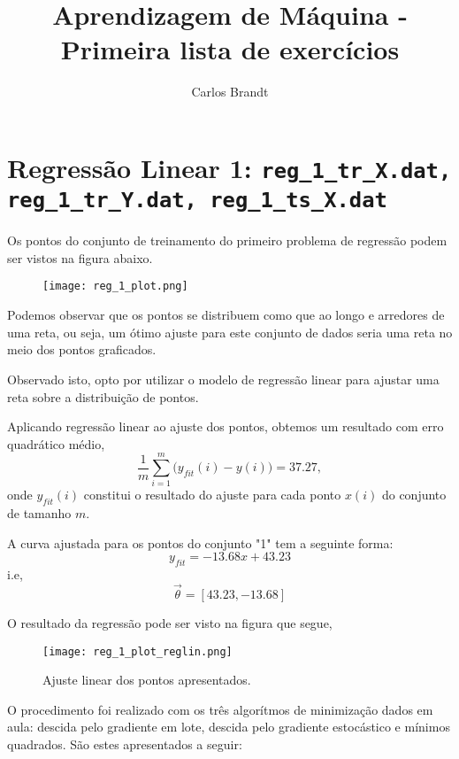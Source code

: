\documentclass[a4paper,12pt]{article}
\author{Carlos Brandt}
\title{Aprendizagem de M\'aquina - Primeira lista de exerc\'icios}
\begin{document}
\maketitle

\section*{Regress\~ao Linear 1: {\small {\tt reg\_1\_tr\_X.dat, reg\_1\_tr\_Y.dat, reg\_1\_ts\_X.dat}}}

Os pontos do conjunto de treinamento do primeiro problema de regress\~ao podem ser vistos na figura abaixo.

\begin{figure}[!h]
	\centering
	\texttt{[image: reg\_1\_plot.png]}
\end{figure}

Podemos observar que os pontos se distribuem como que ao longo e arredores de uma reta, ou seja, um \'otimo ajuste para este conjunto de dados seria uma reta no meio dos pontos graficados.

Observado isto, opto por utilizar o modelo de regress\~ao linear para ajustar uma reta sobre a distribui\c c\~ao de pontos.

Aplicando regress\~ao linear ao ajuste dos pontos, obtemos um resultado com erro quadr\'atico m\'edio,
$$ \frac{1}{m}\sum_{i=1}^{m} \Big( y_{fit}(i) - y(i) \Big) = 37.27, $$
onde $y_{fit}(i)$ constitui o resultado do ajuste para cada ponto $x(i)$ do conjunto de tamanho $m$.

A curva ajustada para os pontos do conjunto "1" tem a seguinte forma:
$$ y_{fit} = -13.68 x + 43.23$$
i.e,
$$\vec \theta = [43.23 , -13.68]$$

O resultado da regress\~ao pode ser visto na figura que segue,
\begin{figure}[!h]
	\centering
	\texttt{[image: reg\_1\_plot\_reglin.png]}
	\caption{Ajuste linear dos pontos apresentados.}
\end{figure}

O procedimento foi realizado com os tr\^es algor\'itmos de minimiza\c c\~ao dados em aula: descida pelo gradiente em lote, descida pelo gradiente estoc\'astico e m\'inimos quadrados. S\~ao estes apresentados a seguir:
\end{document}
